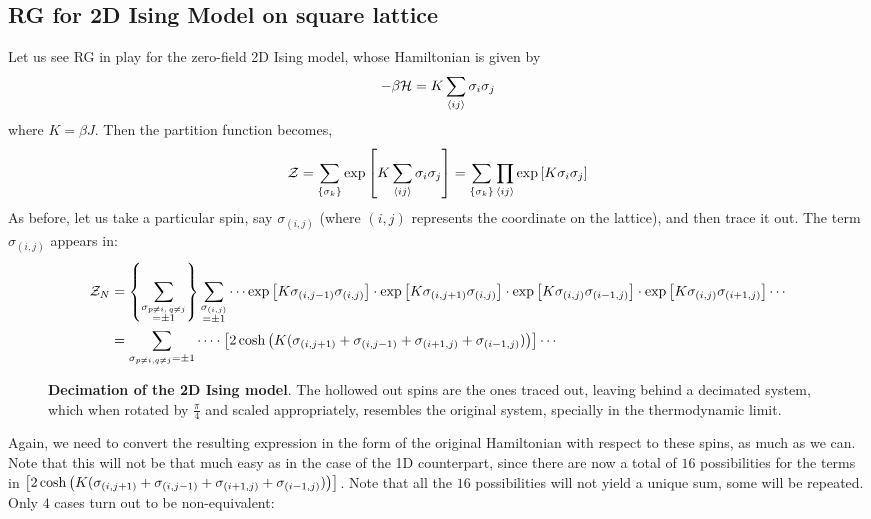 \subsection{RG for 2D Ising Model on square lattice}
Let us see RG in play for the zero-field 2D Ising model, whose Hamiltonian is given by 
\begin{align}\label{ising2dham}
    -\beta \mathcal H = K \sum\limits_{\left\langle ij \right\rangle} \sigma_i \sigma_j
\end{align}
where $K=\beta J$. Then the partition function becomes,
$$\mathcal Z = \sum\limits_{\{\sigma_k\}} \exp\qty[K \sum\limits_{\left\langle ij \right\rangle} \sigma_i \sigma_j] = \sum\limits_{\{\sigma_k\}}\prod\limits_{\left\langle ij \right\rangle} \exp\qty[K  \sigma_i \sigma_j]$$
As before, let us take a particular spin, say $\sigma_{(i,j)}$ (where $(i,j)$ represents the coordinate on the lattice), and then trace it out. The term $\sigma_{(i,j)}$ appears in: 
\begin{align*}
    \mathcal Z_N &=\qty{\sum\limits_{\substack{\sigma_{p\neq i,\, q\neq j}\\ = \pm 1}}} \sum\limits_{\substack{\sigma_{(i,j)}\\ = \pm 1}}\cdots \exp\qty[K\sigma_{(i,j-1)}\sigma_{(i,j)}]\cdot\exp\qty[K\sigma_{(i,j+1)}\sigma_{(i,j)}]\cdot\exp\qty[K\sigma_{(i,j)}\sigma_{(i-1,j)}]\cdot\exp\qty[K\sigma_{(i,j)}\sigma_{(i+1,j)}]\cdots\\
&=\sum\limits_{\sigma_{p\neq i, q\neq j}= \pm 1}\cdots \cdot\qty[2\cosh \qty(K(\sigma_{(i,j+1)}+\sigma_{(i,j-1)}+\sigma_{(i+1,j)}+\sigma_{(i-1,j)}))]\cdots
\end{align*}
\begin{figure}[t]
    \centering 
    
    \caption{\textbf{Decimation of the 2D Ising model}. The hollowed out spins are the ones traced out, leaving behind a decimated system, which when rotated by $\frac{\pi}{4}$ and scaled appropriately, resembles the original system, specially in the thermodynamic limit.}
\end{figure}
\noindent
Again, we need to convert the resulting expression in the form of the original Hamiltonian with respect to these spins, as much as we can. Note that this will not be that much easy as in the case of the 1D counterpart, since there are now a total of $16$ possibilities for the terms in $\qty[2\cosh \qty(K(\sigma_{(i,j+1)}+\sigma_{(i,j-1)}+\sigma_{(i+1,j)}+\sigma_{(i-1,j)}))]$. Note that all the $16$ possibilities will not yield a unique sum, some will be repeated. Only $4$ cases turn out to be non-equivalent: 
